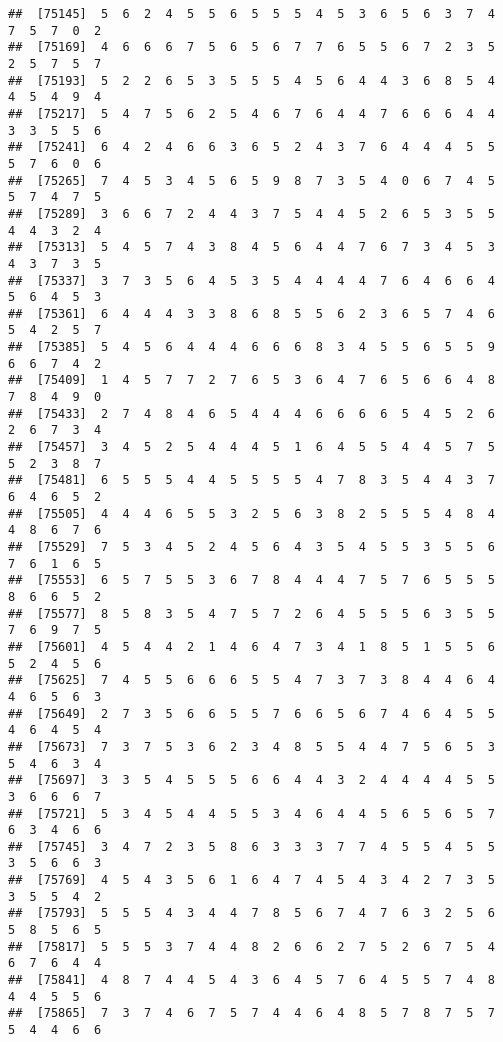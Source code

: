 \documentclass[
]{book}
\begin{document}
\begin{verbatim}
##  [75145]  5  6  2  4  5  5  6  5  5  5  4  5  3  6  5  6  3  7  4  7  5  7  0  2
##  [75169]  4  6  6  6  7  5  6  5  6  7  7  6  5  5  6  7  2  3  5  2  5  7  5  7
##  [75193]  5  2  2  6  5  3  5  5  5  4  5  6  4  4  3  6  8  5  4  4  5  4  9  4
##  [75217]  5  4  7  5  6  2  5  4  6  7  6  4  4  7  6  6  6  4  4  3  3  5  5  6
##  [75241]  6  4  2  4  6  6  3  6  5  2  4  3  7  6  4  4  4  5  5  5  7  6  0  6
##  [75265]  7  4  5  3  4  5  6  5  9  8  7  3  5  4  0  6  7  4  5  5  7  4  7  5
##  [75289]  3  6  6  7  2  4  4  3  7  5  4  4  5  2  6  5  3  5  5  4  4  3  2  4
##  [75313]  5  4  5  7  4  3  8  4  5  6  4  4  7  6  7  3  4  5  3  4  3  7  3  5
##  [75337]  3  7  3  5  6  4  5  3  5  4  4  4  4  7  6  4  6  6  4  5  6  4  5  3
##  [75361]  6  4  4  4  3  3  8  6  8  5  5  6  2  3  6  5  7  4  6  5  4  2  5  7
##  [75385]  5  4  5  6  4  4  4  6  6  6  8  3  4  5  5  6  5  5  9  6  6  7  4  2
##  [75409]  1  4  5  7  7  2  7  6  5  3  6  4  7  6  5  6  6  4  8  7  8  4  9  0
##  [75433]  2  7  4  8  4  6  5  4  4  4  6  6  6  6  5  4  5  2  6  2  6  7  3  4
##  [75457]  3  4  5  2  5  4  4  4  5  1  6  4  5  5  4  4  5  7  5  5  2  3  8  7
##  [75481]  6  5  5  5  4  4  5  5  5  5  4  7  8  3  5  4  4  3  7  6  4  6  5  2
##  [75505]  4  4  4  6  5  5  3  2  5  6  3  8  2  5  5  5  4  8  4  4  8  6  7  6
##  [75529]  7  5  3  4  5  2  4  5  6  4  3  5  4  5  5  3  5  5  6  7  6  1  6  5
##  [75553]  6  5  7  5  5  3  6  7  8  4  4  4  7  5  7  6  5  5  5  8  6  6  5  2
##  [75577]  8  5  8  3  5  4  7  5  7  2  6  4  5  5  5  6  3  5  5  7  6  9  7  5
##  [75601]  4  5  4  4  2  1  4  6  4  7  3  4  1  8  5  1  5  5  6  5  2  4  5  6
##  [75625]  7  4  5  5  6  6  6  5  5  4  7  3  7  3  8  4  4  6  4  4  6  5  6  3
##  [75649]  2  7  3  5  6  6  5  5  7  6  6  5  6  7  4  6  4  5  5  4  6  4  5  4
##  [75673]  7  3  7  5  3  6  2  3  4  8  5  5  4  4  7  5  6  5  3  5  4  6  3  4
##  [75697]  3  3  5  4  5  5  5  6  6  4  4  3  2  4  4  4  4  5  5  3  6  6  6  7
##  [75721]  5  3  4  5  4  4  5  5  3  4  6  4  4  5  6  5  6  5  7  6  3  4  6  6
##  [75745]  3  4  7  2  3  5  8  6  3  3  3  7  7  4  5  5  4  5  5  3  5  6  6  3
##  [75769]  4  5  4  3  5  6  1  6  4  7  4  5  4  3  4  2  7  3  5  3  5  5  4  2
##  [75793]  5  5  5  4  3  4  4  7  8  5  6  7  4  7  6  3  2  5  6  5  8  5  6  5
##  [75817]  5  5  5  3  7  4  4  8  2  6  6  2  7  5  2  6  7  5  4  6  7  6  4  4
##  [75841]  4  8  7  4  4  5  4  3  6  4  5  7  6  4  5  5  7  4  8  4  4  5  5  6
##  [75865]  7  3  7  4  6  7  5  7  4  4  6  4  8  5  7  8  7  5  7  5  4  4  6  6

\end{verbatim}
\end{document}
